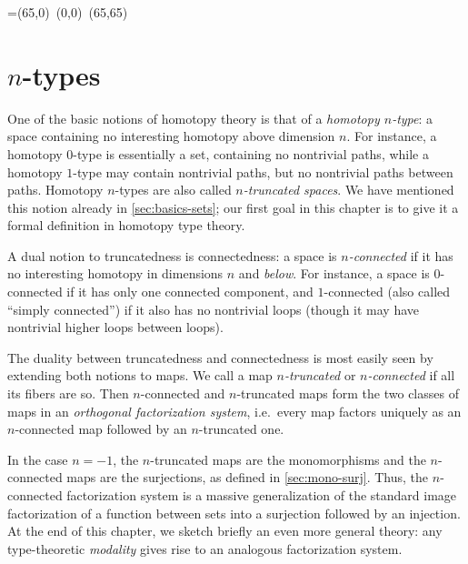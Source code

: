 \bgroup %

\newbox\pbbox
\setbox\pbbox=\hbox{\xy \POS(65,0)\ar@{-} (0,0) \ar@{-} (65,65)\endxy}
\def\pb{\save[]+<3.5mm,-3.5mm>*{\copy\pbbox} \restore}

\newcommand{\comp}[2]{\ensuremath{{#2} \circ {#1}}}
\newcommand{\istype}[1]{\mathsf{is}\mbox{-}{#1}\mbox{-}\mathsf{type}}
\newcommand{\nplusone}{\ensuremath{(n+1)}}
\newcommand{\nminusone}{\ensuremath{(n-1)}}
\newcommand{\fact}{\textsf{fact}}


\chapter{\texorpdfstring{$n$}{n}-types}
\label{cha:hlevels}

One of the basic notions of homotopy theory is that of a \emph{homotopy $n$-type}: a space containing no interesting homotopy above dimension $n$.
For instance, a homotopy $0$-type is essentially a set, containing no nontrivial paths, while a homotopy $1$-type may contain nontrivial paths, but no nontrivial paths between paths.
Homotopy $n$-types are also called \emph{$n$-truncated spaces}.
We have mentioned this notion already in \autoref{sec:basics-sets}; our first goal in this chapter is to give it a formal definition in homotopy type theory.

A dual notion to truncatedness is connectedness: a space is \emph{$n$-connected} if it has no interesting homotopy in dimensions $n$ and \emph{below}.
For instance, a space is $0$-connected if it has only one connected component, and $1$-connected (also called ``simply connected'') if it also has no nontrivial loops (though it may have nontrivial higher loops between loops).

The duality between truncatedness and connectedness is most easily seen by extending both notions to maps.
We call a map \emph{$n$-truncated} or \emph{$n$-connected} if all its fibers are so.
Then $n$-connected and $n$-truncated maps form the two classes of maps in an \emph{orthogonal factorization system}, i.e.\ every map factors uniquely as an $n$-connected map followed by an $n$-truncated one.

In the case $n=-1$, the $n$-truncated maps are the monomorphisms and the $n$-connected maps are the surjections, as defined in \autoref{sec:mono-surj}.
Thus, the $n$-connected factorization system is a massive generalization of the standard image factorization of a function between sets into a surjection followed by an injection.
At the end of this chapter, we sketch briefly an even more general theory: any type-theoretic \emph{modality} gives rise to an analogous factorization system.


